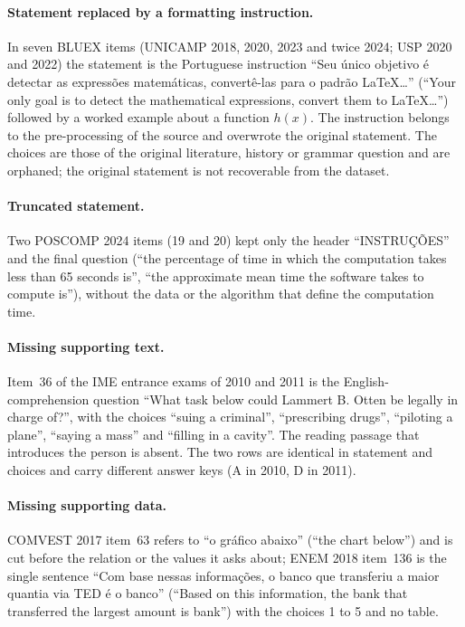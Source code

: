 \paragraph{Statement replaced by a formatting instruction.} In seven BLUEX
items (UNICAMP 2018, 2020, 2023 and twice 2024; USP 2020 and 2022) the
statement is the Portuguese instruction ``Seu único objetivo é detectar as
expressões matemáticas, convertê-las para o padrão LaTeX\ldots'' (``Your only
goal is to detect the mathematical expressions, convert them to LaTeX\ldots'')
followed by a worked example about a function $h(x)$. The instruction belongs
to the pre-processing of the source and overwrote the original statement. The
choices are those of the original literature, history or grammar question and
are orphaned; the original statement is not recoverable from the dataset.

\paragraph{Truncated statement.} Two POSCOMP 2024 items (19 and 20) kept only
the header ``INSTRUÇÕES'' and the final question (``the percentage of time in
which the computation takes less than 65 seconds is'', ``the approximate mean
time the software takes to compute is''), without the data or the algorithm
that define the computation time.

\paragraph{Missing supporting text.} Item~36 of the IME entrance exams of
2010 and 2011 is the English-comprehension question ``What task below could
Lammert B. Otten be legally in charge of?'', with the choices ``suing a
criminal'', ``prescribing drugs'', ``piloting a plane'', ``saying a mass'' and
``filling in a cavity''. The reading passage that introduces the person is
absent. The two rows are identical in statement and choices and carry
different answer keys (A in 2010, D in 2011).

\paragraph{Missing supporting data.} COMVEST 2017 item~63 refers to ``o
gráfico abaixo'' (``the chart below'') and is cut before the relation or the
values it asks about; ENEM 2018 item~136 is the single sentence ``Com base
nessas informações, o banco que transferiu a maior quantia via TED é o banco''
(``Based on this information, the bank that transferred the largest amount is
bank'') with the choices 1 to 5 and no table.

